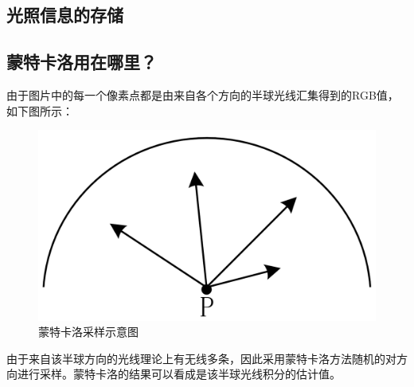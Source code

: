 \documentclass[10pt]{article}
\begin{document}
\subsection{光照信息的存储}

\subsection{蒙特卡洛用在哪里？}
由于图片中的每一个像素点都是由来自各个方向的半球光线汇集得到的RGB值，如下图所示：
\begin{figure}[H]
\begin{center}
\includegraphics[scale=0.25]{monte_carlo_sample.png}
\caption{蒙特卡洛采样示意图}
\end{center}
\end{figure}
由于来自该半球方向的光线理论上有无线多条，因此采用蒙特卡洛方法随机的对方向进行采样。蒙特卡洛的结果可以看成是该半球光线积分的估计值。
\end{document}
